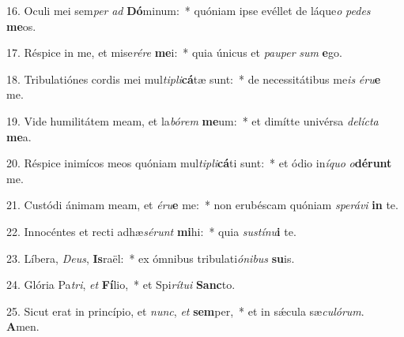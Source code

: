16. Oculi mei sem\textit{per} \textit{ad} \textbf{Dó}minum:~*  quóniam ipse evéllet de láque\textit{o} \textit{pe}\textit{des} \textbf{me}os.\

17. Réspice in me, et mise\textit{ré}\textit{re} \textbf{me}i:~*  quia únicus et \textit{pau}\textit{per} \textit{sum} \textbf{e}go.\

18. Tribulatiónes cordis mei mul\textit{ti}\textit{pli}\textbf{cá}tæ sunt:~*  de necessitátibus me\textit{is} \textit{é}\textit{ru}\textbf{e} me.\

19. Vide humilitátem meam, et la\textit{bó}\textit{rem} \textbf{me}um:~*  et dimítte univérsa \textit{de}\textit{líc}\textit{ta} \textbf{me}a.\

20. Réspice inimícos meos quóniam mul\textit{ti}\textit{pli}\textbf{cá}ti sunt:~*  et ódio in\textit{í}\textit{quo} \textit{o}\textbf{dé}\textbf{runt} me.\

21. Custódi ánimam meam, et \textit{é}\textit{ru}\textbf{e} me:~*  non erubéscam quóniam \textit{spe}\textit{rá}\textit{vi} \textbf{in} te.\

22. Innocéntes et recti adhæ\textit{sé}\textit{runt} \textbf{mi}hi:~*  quia \textit{sus}\textit{tí}\textit{nu}\textbf{i} te.\

23. Líbera, \textit{De}\textit{us}, \textbf{Is}raël:~*  ex ómnibus tribulati\textit{ó}\textit{ni}\textit{bus} \textbf{su}is.\

24. Glória Pa\textit{tri}, \textit{et} \textbf{Fí}lio,~*  et Spi\textit{rí}\textit{tu}\textit{i} \textbf{Sanc}to.\

25. Sicut erat in princípio, et \textit{nunc}, \textit{et} \textbf{sem}per,~*  et in sǽcula sæ\textit{cu}\textit{ló}\textit{rum}. \textbf{A}men.\

